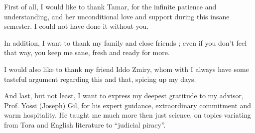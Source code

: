 First of all, I would like to thank Tamar, for the infinite patience and
understanding, and her unconditional love and support during this insane
semester.  I could not have done it without you.

In addition, I want to thank my family and close friends ; even if you don't
feel that way, you keep me sane, fresh and ready for more.

I would also like to thank my friend Iddo Zmiry, whom with I always have some
tasteful argument regarding this and that, spicing up my days.

And last, but not least, I want to express my deepest gratitude to my advisor,
Prof. Yossi (Joseph) Gil, for his expert guidance, extraordinary commitment and
warm hospitality.  He taught me much more then just science, on topics
variating from Tora and English literature to “judicial piracy”.
